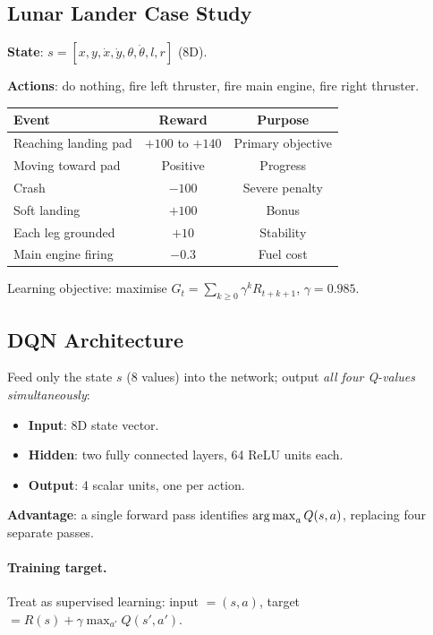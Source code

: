 \subsection{Lunar Lander Case Study}

\textbf{State}: $s=[x,y,\dot{x},\dot{y},\theta,\dot{\theta},l,r]$ (8D).

\textbf{Actions}: do nothing, fire left thruster, fire main engine, fire right
thruster.

\begin{center}
\begin{tabular}{lcc}
\toprule
\textbf{Event} & \textbf{Reward} & \textbf{Purpose}\\
\midrule
Reaching landing pad & $+100$ to $+140$ & Primary objective\\
Moving toward pad     & Positive          & Progress\\
Crash                & $-100$            & Severe penalty\\
Soft landing         & $+100$            & Bonus\\
Each leg grounded    & $+10$             & Stability\\
Main engine firing   & $-0.3$            & Fuel cost\\
\bottomrule
\end{tabular}
\end{center}

Learning objective: maximise $G_t=\sum_{k\ge 0}\gamma^k R_{t+k+1}$,
$\gamma=0.985$.

\subsection{DQN Architecture}

Feed only the state $s$ (8 values) into the network; output
\emph{all four Q-values simultaneously}:

\begin{itemize}
\item \textbf{Input}: 8D state vector.
\item \textbf{Hidden}: two fully connected layers, 64 ReLU units each.
\item \textbf{Output}: 4 scalar units, one per action.
\end{itemize}

\textbf{Advantage}: a single forward pass identifies $\operatorname*{arg\,max}_a Q(s,a)$,
replacing four separate passes.

\paragraph{Training target.}
Treat as supervised learning: input $=(s,a)$, target $=R(s)+\gamma\max_{a'}Q(s',a')$.

